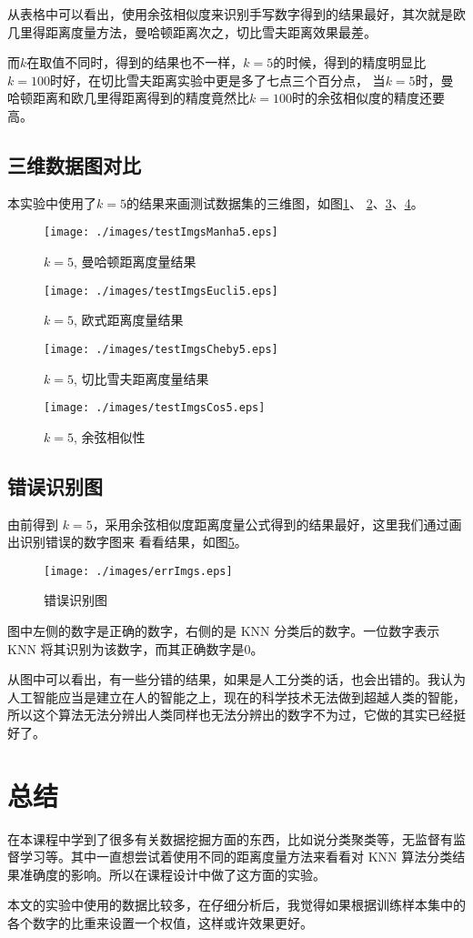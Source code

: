 \documentclass{cugrep}
\begin{document}
从表格中可以看出，使用余弦相似度来识别手写数字得到的结果最好，其次就是欧几里得距离度量方法，曼哈顿距离次之，切比雪夫距离效果最差。

而$k$在取值不同时，得到的结果也不一样，$k = 5$的时候，得到的精度明显比$k=100$时好，在切比雪夫距离实验中更是多了七点三个百分点，
当$k=5$时，曼哈顿距离和欧几里得距离得到的精度竟然比$k=100$时的余弦相似度的精度还要高。

\subsection{三维数据图对比}
本实验中使用了$k=5$的结果来画测试数据集的三维图，如图\ref{fig:testImgsManha5}、
\ref{fig:testImgsEucli5}、\ref{fig:testImgsCheby5}、\ref{fig:testImgsCos5}。

\begin{figure}[htbp]
	\centering
	\texttt{[image: ./images/testImgsManha5.eps]}
	\caption{$k = 5$, 曼哈顿距离度量结果}
	\label{fig:testImgsManha5}
\end{figure}
\begin{figure}[htbp]
	\centering
	\texttt{[image: ./images/testImgsEucli5.eps]}
	\caption{$k = 5$, 欧式距离度量结果}
	\label{fig:testImgsEucli5}
\end{figure}
\begin{figure}[htbp]
	\centering
	\texttt{[image: ./images/testImgsCheby5.eps]}
	\caption{$k = 5$, 切比雪夫距离度量结果}
	\label{fig:testImgsCheby5}
\end{figure}
\begin{figure}[htbp]
	\centering
	\texttt{[image: ./images/testImgsCos5.eps]}
	\caption{$k = 5$, 余弦相似性}
	\label{fig:testImgsCos5}
\end{figure}

\subsection{错误识别图}
由前得到 $k=5$，采用余弦相似度距离度量公式得到的结果最好，这里我们通过画出识别错误的数字图来
看看结果，如图\ref{fig:errImgs}。

\begin{figure}[htbp]
	\centering
	\texttt{[image: ./images/errImgs.eps]}
	\caption{错误识别图}
	\label{fig:errImgs}
\end{figure}

图中左侧的数字是正确的数字，右侧的是 KNN 分类后的数字。一位数字表示KNN 将其识别为该数字，而其正确数字是0。

从图中可以看出，有一些分错的结果，如果是人工分类的话，也会出错的。我认为人工智能应当是建立在人的智能之上，现在的科学技术无法做到超越人类的智能，
所以这个算法无法分辨出人类同样也无法分辨出的数字不为过，它做的其实已经挺好了。
\section{总结}
在本课程中学到了很多有关数据挖掘方面的东西，比如说分类聚类等，无监督有监督学习等。其中一直想尝试着使用不同的距离度量方法来看看对 KNN 算法分类结果准确度的影响。所以在课程设计中做了这方面的实验。

本文的实验中使用的数据比较多，在仔细分析后，我觉得如果根据训练样本集中的各个数字的比重来设置一个权值，这样或许效果更好。
\end{document}
